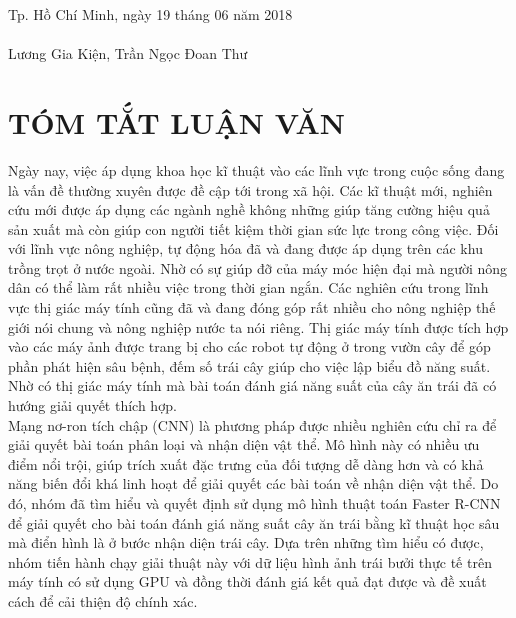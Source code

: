 \documentclass[a4paper,12pt,oneside]{ThesisStyle}
\begin{document}
\begin{flushright}
Tp. Hồ Chí Minh, ngày 19 tháng 06 năm 2018 \\
\hfill \\
Lương Gia Kiện, Trần Ngọc Đoan Thư
\end{flushright}

\cleardoublepage

\chapter*{TÓM TẮT LUẬN VĂN}
Ngày nay, việc áp dụng khoa học kĩ thuật vào các lĩnh vực trong cuộc sống đang là vấn đề thường xuyên được đề cập tới trong xã hội. Các kĩ thuật mới, nghiên cứu mới được áp dụng các ngành nghề không những giúp tăng cường hiệu quả sản xuất mà còn giúp con người tiết kiệm thời gian sức lực trong công việc. Đối với lĩnh vực nông nghiệp, tự động hóa đã và đang được áp dụng trên các khu trồng trọt ở nước ngoài. Nhờ có sự giúp đỡ của máy móc hiện đại mà người nông dân có thể làm rất nhiều việc trong thời gian ngắn.
Các nghiên cứu trong lĩnh vực thị giác máy tính cũng đã và đang đóng góp rất nhiều cho nông nghiệp thế giới nói chung và nông nghiệp nước ta nói riêng. Thị giác máy tính được tích hợp vào các máy ảnh được trang bị cho các robot tự động ở trong vườn cây để góp phần phát hiện sâu bệnh, đếm số trái cây giúp cho việc lập biểu đồ năng suất. Nhờ có thị giác máy tính mà bài toán đánh giá năng suất của cây ăn trái đã có hướng giải quyết thích hợp.
~\\

Mạng nơ-ron tích chập (CNN) là phương pháp được nhiều nghiên cứu chỉ ra để giải quyết bài toán phân loại và nhận diện vật thể. Mô hình này có nhiều ưu điểm nổi trội, giúp trích xuất đặc trưng của đối tượng dễ dàng hơn và có khả năng biến đổi khá linh hoạt để giải quyết các bài toán về nhận diện vật thể. Do đó, nhóm đã tìm hiểu và quyết định sử dụng mô hình thuật toán Faster R-CNN để giải quyết cho bài toán đánh giá năng suất cây ăn trái bằng kĩ thuật học sâu mà điển hình là ở bước nhận diện trái cây. Dựa trên những tìm hiểu có được, nhóm tiến hành chạy giải thuật này với dữ liệu hình ảnh trái bưởi thực tế trên máy tính có sử dụng GPU và đồng thời đánh giá kết quả đạt được và đề xuất cách để cải thiện độ chính xác.

\cleardoublepage

\renewcommand{\listfigurename}{MỤC LỤC HÌNH}
\renewcommand{\listtablename}{MỤC LỤC BẢNG}
\renewcommand{\figurename}{Hình}
\renewcommand{\tablename}{Bảng}
\end{document}
